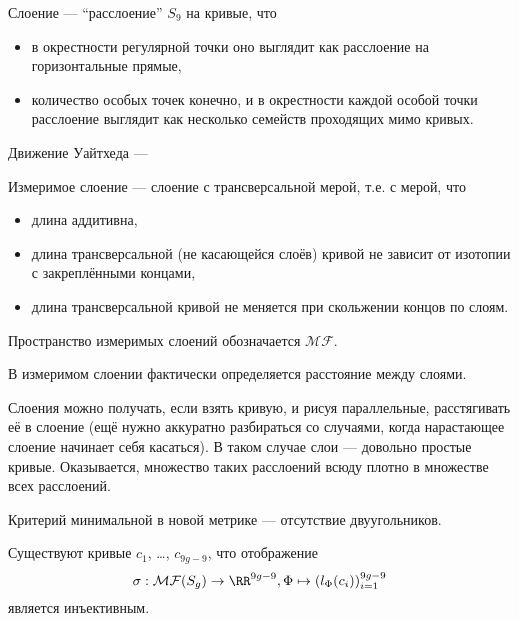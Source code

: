 \documentclass[12pt,a4paper]{article}
\newcommand{\MF}{\mathcal{MF}}
\begin{document}
    \begin{definition}
        Слоение --- ``расслоение'' $S_9$ на кривые, что
        \begin{itemize}
            \item в окрестности регулярной точки оно выглядит как расслоение на горизонтальные прямые,
            \item количество особых точек конечно, и в окрестности каждой особой точки расслоение выглядит как несколько семейств проходящих мимо кривых.
        \end{itemize}

        Движение Уайтхеда --- 

        Измеримое слоение --- слоение с трансверсальной мерой, т.е. с мерой, что
        \begin{itemize}
            \item длина аддитивна,
            \item длина трансверсальной (не касающейся слоёв) кривой не зависит от изотопии с закреплёнными концами,
            \item длина трансверсальной кривой не меняется при скольжении концов по слоям.
        \end{itemize}

        Пространство измеримых слоений обозначается $\MF$.
    \end{definition}

    \begin{remark}
        В измеримом слоении фактически определяется расстояние между слоями.
    \end{remark}

    \begin{remark}
        Слоения можно получать, если взять кривую, и рисуя параллельные, расстягивать её в слоение (ещё нужно аккуратно разбираться со случаями, когда нарастающее слоение начинает себя касаться). В таком случае слои --- довольно простые кривые. Оказывается, множество таких расслоений всюду плотно в множестве всех расслоений.
    \end{remark}

    \begin{lemma}
        Критерий минимальной в новой метрике --- отсутствие двуугольников.
    \end{lemma}

    \begin{theorem}
        Существуют кривые $c_1$, \dots, $c_{9g-9}$, что отображение
        \[\sigma: \MF(S_g) \to \RR^{9g-9}, \Phi \mapsto (l_\Phi(c_i))_{i=1}^{9g-9}\]
        является инъективным. 
    \end{theorem}
\end{document}
